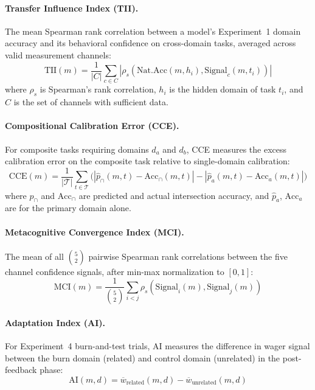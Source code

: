 \documentclass[10pt]{article}
\newcommand{\MCI}{MCI}
\newcommand{\CCE}{CCE}
\newcommand{\TII}{TII}
\newcommand{\AI}{AI}
\begin{document}
\paragraph{Transfer Influence Index (\TII{}).}
The mean Spearman rank correlation between a model's Experiment~1 domain accuracy and its behavioral confidence on cross-domain tasks, averaged across valid measurement channels:
\begin{equation}
\text{TII}(m) = \frac{1}{|C|} \sum_{c \in C} |\rho_s(\text{Nat.Acc}(m, h_i), \text{Signal}_c(m, t_i))|
\end{equation}
where $\rho_s$ is Spearman's rank correlation, $h_i$ is the hidden domain of task $t_i$, and $C$ is the set of channels with sufficient data.

\paragraph{Compositional Calibration Error (\CCE{}).}
For composite tasks requiring domains $d_a$ and $d_b$, CCE measures the excess calibration error on the composite task relative to single-domain calibration:
\begin{equation}
\text{CCE}(m) = \frac{1}{|\mathcal{T}|} \sum_{t \in \mathcal{T}} \bigl(|\hat{p}_{\cap}(m,t) - \text{Acc}_{\cap}(m,t)| - |\hat{p}_{a}(m,t) - \text{Acc}_{a}(m,t)|\bigr)
\end{equation}
where $\hat{p}_{\cap}$ and $\text{Acc}_{\cap}$ are predicted and actual intersection accuracy, and $\hat{p}_a$, $\text{Acc}_a$ are for the primary domain alone.

\paragraph{Metacognitive Convergence Index (\MCI{}).}
The mean of all $\binom{5}{2}$ pairwise Spearman rank correlations between the five channel confidence signals, after min-max normalization to $[0,1]$:
\begin{equation}
\text{MCI}(m) = \frac{1}{\binom{5}{2}} \sum_{i < j} \rho_s(\text{Signal}_i(m), \text{Signal}_j(m))
\end{equation}

\paragraph{Adaptation Index (\AI{}).}
For Experiment~4 burn-and-test trials, AI measures the difference in wager signal between the burn domain (related) and control domain (unrelated) in the post-feedback phase:
\begin{equation}
\text{AI}(m, d) = \overline{w}_{\text{related}}(m, d) - \overline{w}_{\text{unrelated}}(m, d)
\end{equation}
\end{document}
